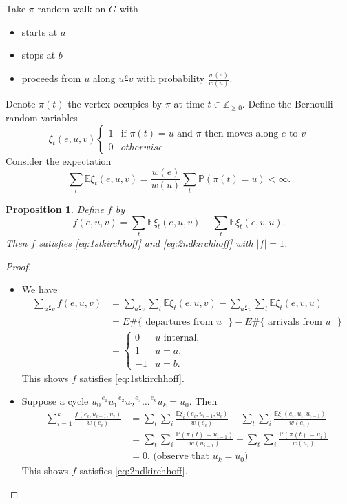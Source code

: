 \documentclass{report}
\newcommand{\Z}{\mathbb{Z}}
\newcommand{\matP}{\mathbb{P}}
\newcommand{\matE}{\mathbb{E}}
\newtheorem{proposition}{Proposition}[section]
\theoremstyle{definition}
\theoremstyle{remark}
\numberwithin{equation}{section}
\newcommand{\fnl}{\parbox[t]{0\linewidth}{}}
\begin{document}
Take $\pi$ random walk on $G$ with \begin{itemize}
    \item starts at $a$
    \item stops at $b$
    \item proceeds from $u$ along $u \frac{e}{} v$ with probability $\frac{w(e)}{w(u)}$.
\end{itemize}
Denote $\pi(t)$ the vertex occupies by $\pi$ at time $t \in \Z_{\geq 0}$. Define the Bernoulli random variables \[\xi_t(e, u, v)
\begin{cases}
    1 & \text{if $\pi(t) = u$ and $\pi$ then moves along $e$ to $v$} \\
    0 & otherwise
\end{cases}
\]
Consider the expectation \[
\sum_t \matE\xi_t(e, u, v) = \frac{w(e)}{w(u)} \sum_t \matP(\pi(t) = u) < \infty.    
\]

\begin{proposition}
    Define $f$ by \[f(e, u, v) = \sum_t \matE\xi_t(e, u, v) - \sum_t \matE\xi_t(e, v, u).\]
    Then $f$ satisfies \eqref{eq:1stkirchhoff} and \eqref{eq:2ndkirchhoff} with $|f| = 1$.
\end{proposition}
\begin{proof}\fnl
    \begin{itemize}
        \item We have \begin{align*}
            \sum_{u \frac{e}{} v} f(e, u, v) & = \sum_{u \frac{e}{} v}\sum_t \matE\xi_t(e, u, v) -  \sum_{u \frac{e}{} v}\sum_t \matE\xi_t(e, v, u) \\
            & = E\#\{\text{ departures from $u$ }\} - E\#\{\text{ arrivals from $u$ }\} \\
            & = \begin{cases}
                0 & u \text{ internal}, \\
                1 & u = a,\\
                -1 & u = b.
            \end{cases}
        \end{align*}
        This shows $f$ satisfies \eqref{eq:1stkirchhoff}.

        \item Suppose a cycle $u_0 \frac{e_1}{} u_1 \frac{e_2}{} u_2 \frac{e_3}{} \ldots \frac{e_k}{} u_k = u_0$. Then \begin{align*}
            \sum_{i = 1}^k \frac{f(e_i, u_{i-1}, u_i)}{w(e_i)} & = \sum_{t}\sum_{i} \frac{\matE\xi_i(e_i, u_{i - 1}, u_i)}{w(e_i)} - \sum_{t}\sum_{i} \frac{\matE\xi_i(e_i, u_{i}, u_{i - 1})}{w(e_i)} \\
            & = \sum_t \sum_i \frac{\matP(\pi(t) = u_{i - 1})}{w(u_{i - 1})} - \sum_t \sum_i \frac{\matP(\pi(t) = u_i)}{w(u_i)} \\
            & = 0. \text{ (observe that $u_k = u_0$)}
        \end{align*}
        This shows $f$ satisfies \eqref{eq:2ndkirchhoff}. \qedhere
    \end{itemize}
\end{proof}
\end{document}
